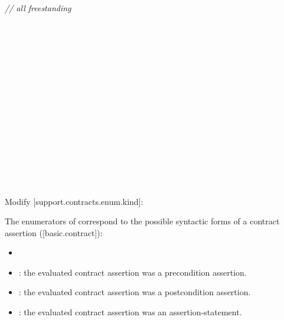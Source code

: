 \begin{adjustwidth}{0.5cm}{0.5cm}
\emph{// all freestanding} \\
 \\
\\
\codetab {} \\
\codetab \codetab {} \\
\codetab \codetab {} \\
\codetab \codetab {} \\
\codetab \codetab {} \\
\codetab \tcode{\};} \\
\\
\codetab \tcode{[...]} \\ 
\\
\codetab {} \\
\codetab \codetab {} \\
\codetab \codetab {} \\
\codetab \codetab {} \\
\codetab \tcode{\};} 
\end{adjustwidth}

Modify [support.contracts.enum.kind]:

\begin{adjustwidth}{0.5cm}{0.5cm}
The enumerators of  correspond to the possible syntactic forms of a contract assertion ([basic.contract]):
\begin{itemize}
\item {}
\item {}: the evaluated contract assertion was a precondition assertion.
\item {}: the evaluated contract assertion was a postcondition assertion.
\item {}: the evaluated contract assertion was an assertion-statement.
\end{itemize}
\end{adjustwidth}

